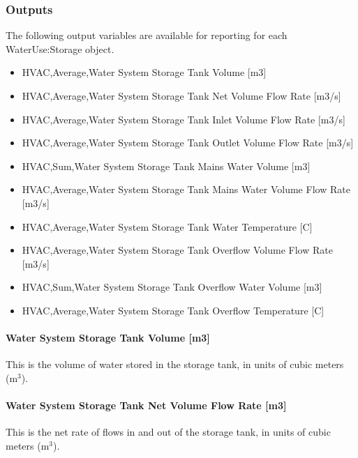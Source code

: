 \subsubsection{Outputs}\label{outputs-2-026}

The following output variables are available for reporting for each WaterUse:Storage object.

\begin{itemize}
\item
  HVAC,Average,Water System Storage Tank Volume {[}m3{]}
\item
  HVAC,Average,Water System Storage Tank Net Volume Flow Rate {[}m3/s{]}
\item
  HVAC,Average,Water System Storage Tank Inlet Volume Flow Rate {[}m3/s{]}
\item
  HVAC,Average,Water System Storage Tank Outlet Volume Flow Rate {[}m3/s{]}
\item
  HVAC,Sum,Water System Storage Tank Mains Water Volume {[}m3{]}
\item
  HVAC,Average,Water System Storage Tank Mains Water Volume Flow Rate {[}m3/s{]}
\item
  HVAC,Average,Water System Storage Tank Water Temperature {[}C{]}
\item
  HVAC,Average,Water System Storage Tank Overflow Volume Flow Rate {[}m3/s{]}
\item
  HVAC,Sum,Water System Storage Tank Overflow Water Volume {[}m3{]}
\item
  HVAC,Average,Water System Storage Tank Overflow Temperature {[}C{]}
\end{itemize}

\paragraph{Water System Storage Tank Volume {[}m3{]}}\label{water-system-storage-tank-volume-m3}

This is the volume of water stored in the storage tank, in units of cubic meters (m\(^{3}\)).

\paragraph{Water System Storage Tank Net Volume Flow Rate {[}m3{]}}\label{water-system-storage-tank-net-volume-flow-rate-m3}

This is the net rate of flows in and out of the storage tank, in units of cubic meters (m\(^{3}\)).

